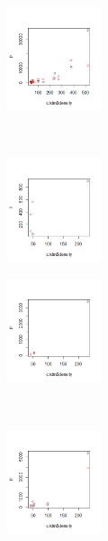 \begin{figure}[t!]
    \centering
    \begin{subfigure}[t]{0.5\textwidth}
        \centering
        \includegraphics[height=1.2in]{pictures/Modell_1/repeat = 30/image_30-4/Rplot}
    \end{subfigure}%
    ~ 
    \begin{subfigure}[t]{0.5\textwidth}
        \centering
        \includegraphics[height=1.2in]{pictures/Modell_1/repeat = 30/image_30-4/Rplot01}
    \end{subfigure}
\end{figure}

\begin{figure}[t!]
    \centering
    \begin{subfigure}[t]{0.5\textwidth}
        \centering
        \includegraphics[height=1.2in]{pictures/Modell_1/repeat = 30/image_30-5/Rplot}
    \end{subfigure}%
    ~ 
    \begin{subfigure}[t]{0.5\textwidth}
        \centering
        \includegraphics[height=1.2in]{pictures/Modell_1/repeat = 30/image_30-5/Rplot01}
    \end{subfigure}
\end{figure}

